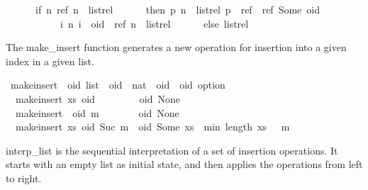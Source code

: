 \begin{isabellebody}
\ \ \ \ \ \ if\ {\isasymexists}n{\isachardot}\ {\isacharparenleft}ref{\isacharcomma}\ n{\isacharparenright}\ {\isasymin}\ list{\isacharunderscore}rel\isanewline
\ \ \ \ \ \ then\ {\isacharbraceleft}{\isacharparenleft}p{\isacharcomma}\ n{\isacharparenright}\ {\isasymin}\ list{\isacharunderscore}rel{\isachardot}\ p\ {\isasymnoteq}\ ref{\isacharbraceright}\ {\isasymunion}\ {\isacharbraceleft}{\isacharparenleft}ref{\isacharcomma}\ Some\ oid{\isacharparenright}{\isacharbraceright}\ {\isasymunion}\isanewline
\ \ \ \ \ \ \ \ \ \ \ {\isacharbraceleft}{\isacharparenleft}i{\isacharcomma}\ n{\isacharparenright}{\isachardot}\ i\ {\isacharequal}\ oid\ {\isasymand}\ {\isacharparenleft}ref{\isacharcomma}\ n{\isacharparenright}\ {\isasymin}\ list{\isacharunderscore}rel{\isacharbraceright}\isanewline
\ \ \ \ \ \ else\ list{\isacharunderscore}rel{\isacharparenright}{\isachardoublequoteclose}%
\begin{isamarkuptext}%
The make\_insert function generates a new operation for insertion into
a given index in a given list.%
\end{isamarkuptext}\isamarkuptrue%
\isamarkupfalse%
\ make{\isacharunderscore}insert\ {\isacharcolon}{\isacharcolon}\ {\isachardoublequoteopen}{\isacharprime}oid\ list\ {\isasymRightarrow}\ {\isacharprime}oid\ {\isasymRightarrow}\ nat\ {\isasymRightarrow}\ {\isacharparenleft}{\isacharprime}oid\ {\isasymtimes}\ {\isacharprime}oid\ option{\isacharparenright}{\isachardoublequoteclose}\ \isanewline
\ \ {\isachardoublequoteopen}make{\isacharunderscore}insert\ xs\ oid\ {}\ \ \ \ \ \ \ {\isacharequal}\ {\isacharparenleft}oid{\isacharcomma}\ None{\isacharparenright}{\isachardoublequoteclose}\ {\isacharbar}\isanewline
\ \ {\isachardoublequoteopen}make{\isacharunderscore}insert\ {\isacharbrackleft}{\isacharbrackright}\ oid\ m\ \ \ \ \ \ \ {\isacharequal}\ {\isacharparenleft}oid{\isacharcomma}\ None{\isacharparenright}{\isachardoublequoteclose}\ {\isacharbar}\isanewline
\ \ {\isachardoublequoteopen}make{\isacharunderscore}insert\ xs\ oid\ {\isacharparenleft}Suc\ m{\isacharparenright}\ {\isacharequal}\ {\isacharparenleft}oid{\isacharcomma}\ Some\ {\isacharparenleft}xs\ {\isacharbang}\ min\ {\isacharparenleft}length\ xs\ {\isacharminus}\ {}{\isacharparenright}\ m{\isacharparenright}{\isacharparenright}{\isachardoublequoteclose}%
\begin{isamarkuptext}%
interp\_list is the sequential interpretation of a set of insertion
operations. It starts with an empty list as initial state, and then applies
the operations from left to right.%

\end{isamarkuptext}
\end{isabellebody}
